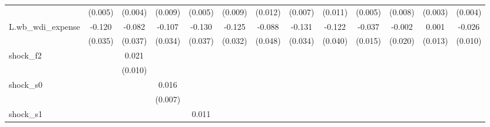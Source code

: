 {\begin{tabular}{l*{12}{c}}
            &     (0.005)         &     (0.004)         &     (0.009)         &     (0.005)         &     (0.009)         &     (0.012)         &     (0.007)         &     (0.011)         &     (0.005)         &     (0.008)         &     (0.003)         &     (0.004)         \\
\addlinespace
L.wb\_wdi\_expense&      -0.120\sym{***}&      -0.082\sym{**} &      -0.107\sym{***}&      -0.130\sym{***}&      -0.125\sym{***}&      -0.088\sym{*}  &      -0.131\sym{***}&      -0.122\sym{***}&      -0.037\sym{**} &      -0.002         &       0.001         &      -0.026\sym{**} \\
            &     (0.035)         &     (0.037)         &     (0.034)         &     (0.037)         &     (0.032)         &     (0.048)         &     (0.034)         &     (0.040)         &     (0.015)         &     (0.020)         &     (0.013)         &     (0.010)         \\
\addlinespace
shock\_f2    &                     &       0.021\sym{**} &                     &                     &                     &                     &                     &                     &                     &                     &                     &                     \\
            &                     &     (0.010)         &                     &                     &                     &                     &                     &                     &                     &                     &                     &                     \\
\addlinespace
shock\_s0    &                     &                     &       0.016\sym{**} &                     &                     &                     &                     &                     &                     &                     &                     &                     \\
            &                     &                     &     (0.007)         &                     &                     &                     &                     &                     &                     &                     &                     &                     \\
\addlinespace
shock\_s1    &                     &                     &                     &       0.011\sym{**} &                     &                     &                     &                     &                     &                     &                     &                     \\

\end{tabular}}
